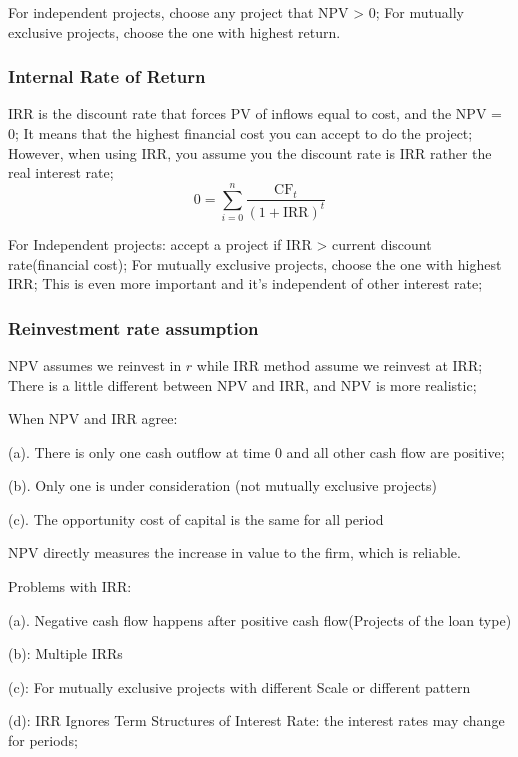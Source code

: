 \documentclass[10pt, a4paper]{article}
\begin{document}
                For independent projects, choose any project that NPV > 0; For mutually exclusive projects, choose the one with highest return. 
            \subsubsection{Internal Rate of Return}
                IRR is the discount rate that forces PV of inflows equal to cost, and the NPV = 0; It means that the highest financial cost you can accept to do the project; However, when using IRR, you assume you the discount rate is IRR rather the real interest rate; 
                $$0 = \sum_{i = 0}^{n}\frac{\text{CF}_t}{(1 + \text{IRR})^t}$$

                For Independent projects: accept a project if IRR > current discount rate(financial cost); For mutually exclusive projects, choose the one with highest IRR; This is even more important and it's independent of other interest rate; 
            \subsubsection{Reinvestment rate assumption}
                NPV assumes we reinvest in $r$  while IRR method assume we reinvest at IRR; There is a little different between NPV and IRR, and NPV is more realistic;

                When NPV and IRR agree: 
                
                \quad(a). There is only one cash outflow at time 0 and all other cash flow are positive; 

                \quad(b). Only one is under consideration (not mutually exclusive projects) 

                \quad(c). The opportunity cost of capital is the same for all period 

                NPV directly measures the increase in value to the firm, which is reliable. 

                Problems with IRR: 

                \quad(a). Negative cash flow happens after positive cash flow(Projects of the loan type)

                \quad(b): Multiple IRRs
                
                \quad(c):  For mutually exclusive projects with different Scale or different pattern

                \quad(d): IRR Ignores Term Structures of Interest Rate: the interest rates may change for periods;
\end{document}
